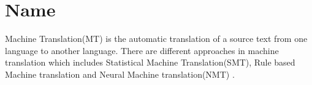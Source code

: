 \chapter{Name}
Machine Translation(MT) is the automatic translation of a source text from one language to another language. There are different approaches in machine translation which includes Statistical Machine Translation(SMT), Rule based Machine translation and Neural Machine translation(NMT) \cite{TAN20205}. 





